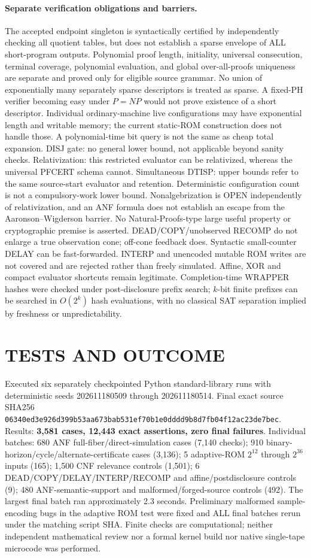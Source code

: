 \documentclass[11pt]{article}
\begin{document}
\paragraph{Separate verification obligations and barriers.}
The accepted endpoint singleton is syntactically certified by independently checking all quotient tables, but does not establish a sparse envelope of ALL short-program outputs. Polynomial proof length, initiality, universal consecution, terminal coverage, polynomial evaluation, and global over-all-proofs uniqueness are separate and proved only for eligible source grammar. No union of exponentially many separately sparse descriptors is treated as sparse. A fixed-PH verifier becoming easy under $P=NP$ would not prove existence of a short descriptor. Individual ordinary-machine live configurations may have exponential length and writable memory; the current static-ROM construction does not handle those. A polynomial-time bit query is not the same as cheap total expansion.
DISJ gate: no general lower bound, not applicable beyond sanity checks. Relativization: this restricted evaluator can be relativized, whereas the universal PFCERT schema cannot. Simultaneous DTISP: upper bounds refer to the same source-start evaluator and retention. Deterministic configuration count is not a compulsory-work lower bound. Nonalgebrization is OPEN independently of relativization, and an ANF formula does not establish an escape from the Aaronson--Wigderson barrier. No Natural-Proofs-type large useful property or cryptographic premise is asserted.
DEAD/COPY/unobserved RECOMP do not enlarge a true observation cone; off-cone feedback does. Syntactic small-counter DELAY can be fast-forwarded. INTERP and unencoded mutable ROM writes are not covered and are rejected rather than freely simulated. Affine, XOR and compact evaluator shortcuts remain legitimate. Completion-time WRAPPER hashes were checked under post-disclosure prefix search; $k$-bit finite prefixes can be searched in $O(2^k)$ hash evaluations, with no classical SAT separation implied by freshness or unpredictability.

\section{TESTS AND OUTCOME}
Executed six separately checkpointed Python standard-library runs with deterministic seeds 202611180509 through 202611180514. Final exact source SHA256 \texttt{06340ed3e926d399b53aa673bab531ef70b1e0dddd9b8d7fb04f12ac23de7bec}. Results: \textbf{3,581 cases, 12,443 exact assertions, zero final failures}. Individual batches: 680 ANF full-fiber/direct-simulation cases (7,140 checks); 910 binary-horizon/cycle/alternate-certificate cases (3,136); 5 adaptive-ROM $2^{12}$ through $2^{36}$ inputs (165); 1,500 CNF relevance controls (1,501); 6 DEAD/COPY/DELAY/INTERP/RECOMP and affine/postdisclosure controls (9); 480 ANF-semantic-support and malformed/forged-source controls (492). The largest final batch ran approximately 2.3 seconds. Preliminary malformed sample-encoding bugs in the adaptive ROM test were fixed and ALL final batches rerun under the matching script SHA. Finite checks are computational; neither independent mathematical review nor a formal kernel build nor native single-tape microcode was performed.
\end{document}
